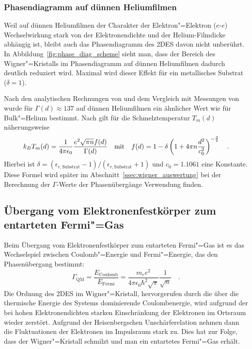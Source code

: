 \subsubsection{Phasendiagramm auf dünnen Heliumfilmen}
\label{ssec:phasediag_films}
Weil auf dünnen Heliumfilmen der Charakter der Elektron"=Elektron ($e$-$e$) Wechselwirkung stark von der Elektronendichte und der Helium-Filmdicke abhängig ist, bleibt auch das Phasendiagramm des 2DES davon nicht unberührt. In Abbildung~\ref{fig:phase_diag_scheme} sieht man, dass der Bereich des Wigner"=Kristalls im Phasendiagramm auf dünnen Heliumfilmen dadurch deutlich reduziert wird. Maximal wird dieser Effekt für ein metallisches Substrat ($\delta=1$).

Nach den analytischen Rechnungen von  \cite{Sai89} und dem Vergleich mit Messungen von  wurde für $\Gamma(d)\approx137$ auf dünnen Heliumfilmen ein ähnlicher Wert wie für Bulk"=Helium bestimmt. Nach  gilt für die Schmelztemperatur $T_m(d)$ näherungsweise
\begin{equation}
	\label{eqn:wc_melting_temp}
	k_BT_m(d)=\frac1{4\pi\epsilon_0}\frac{e^2\sqrt{\pi n}f(d)}{\Gamma(d)}\quad\text{mit}\quad
	f(d)=1-\delta\left(1+4\pi n \frac{d^2}{c_0^2}\right)^{-\frac32}\quad.
\end{equation}
Hierbei ist $\delta=(\epsilon_{r,\text{Substrat}}-1)/(\epsilon_{r,\text{Substrat}}+1)$ und $c_0=1.1061$ eine Konstante. Diese Formel wird später im Abschnitt~\ref{ssec:wigner_auswertung} bei der Berechnung der $\Gamma$-Werte der Phasenübergänge Verwendung finden.

\subsection{Übergang vom Elektronenfestkörper zum entarteten Fermi"=Gas}
Beim Übergang vom Elektronenfestkörper zum entarteten Fermi"=Gas ist es das Wechselspiel zwischen Coulomb"=Energie und Fermi"=Energie, das den Phasenübergang bestimmt:
\begin{equation}
	\label{eqn:qm_Gamma}
	\Gamma_\text{QM}=\frac{E_\text{Coulomb}}{E_\text{Fermi}}
		=\frac{m_e e^2}{4\pi\epsilon_0\hbar^2 \sqrt{\pi}}\frac1{\sqrt{n}}\quad.
\end{equation}
Die Ordnung des 2DES im Wigner"=Kristall, hervorgerufen durch die über die thermische Energie des Systems dominierende Coulombenergie, wird aufgrund der bei hohen Elektronendichten starken Einschränkung der Elektronen im Ortsraum wieder zerstört. Aufgrund der Heisenbergschen Unschärferelation nehmen dann die Fluktuationen der Elektronen im Impulsraum stark zu. Dies hat zur Folge, dass der Wigner"=Kristall schmilzt und man ein entartetes Fermi"=Gas erhält.

